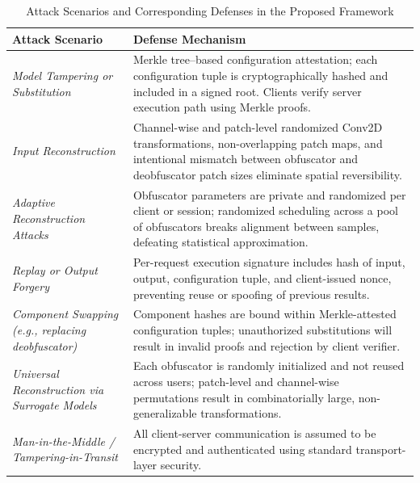\documentclass{ieeeaccess}
\begin{document}
\begin{table}[t]
\centering
\caption{Attack Scenarios and Corresponding Defenses in the Proposed Framework}
\label{tab:threat-defense}
\begin{tabular}{p{} p{}}
\toprule

\textbf{Attack Scenario} & \textbf{Defense Mechanism} \\

\midrule

\textit{Model Tampering or Substitution} &
Merkle tree–based configuration attestation; each configuration tuple is cryptographically hashed and included in a signed root. Clients verify server execution path using Merkle proofs. \\

\midrule

\textit{Input Reconstruction} &
Channel-wise and patch-level randomized Conv2D transformations, non-overlapping patch maps, and intentional mismatch between obfuscator and deobfuscator patch sizes eliminate spatial reversibility. \\

\midrule

\textit{Adaptive Reconstruction Attacks} &
Obfuscator parameters are private and randomized per client or session; randomized scheduling across a pool of obfuscators breaks alignment between samples, defeating statistical approximation. \\

\midrule

\textit{Replay or Output Forgery} &
Per-request execution signature includes hash of input, output, configuration tuple, and client-issued nonce, preventing reuse or spoofing of previous results. \\

\midrule

\textit{Component Swapping (e.g., replacing deobfuscator)} &
Component hashes are bound within Merkle-attested configuration tuples; unauthorized substitutions will result in invalid proofs and rejection by client verifier. \\

\midrule

\textit{Universal Reconstruction via Surrogate Models} &
Each obfuscator is randomly initialized and not reused across users; patch-level and channel-wise permutations result in combinatorially large, non-generalizable transformations. \\

\midrule

\textit{Man-in-the-Middle / Tampering-in-Transit} &
All client-server communication is assumed to be encrypted and authenticated using standard transport-layer security. \\

\bottomrule
\end{tabular}
\end{table}
\end{document}

